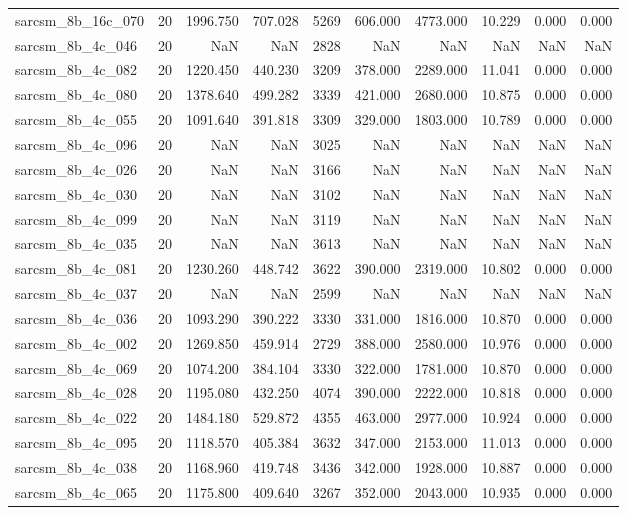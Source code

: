 \begin{tabular}{lrrrrrrrrr}
sarcsm\_8b\_16c\_070 & 20 & 1996.750 & 707.028 & 5269 & 606.000 & 4773.000 & 10.229 & 0.000 & 0.000 \\
sarcsm\_8b\_4c\_046 & 20 & NaN & NaN & 2828 & NaN & NaN & NaN & NaN & NaN \\
sarcsm\_8b\_4c\_082 & 20 & 1220.450 & 440.230 & 3209 & 378.000 & 2289.000 & 11.041 & 0.000 & 0.000 \\
sarcsm\_8b\_4c\_080 & 20 & 1378.640 & 499.282 & 3339 & 421.000 & 2680.000 & 10.875 & 0.000 & 0.000 \\
sarcsm\_8b\_4c\_055 & 20 & 1091.640 & 391.818 & 3309 & 329.000 & 1803.000 & 10.789 & 0.000 & 0.000 \\
sarcsm\_8b\_4c\_096 & 20 & NaN & NaN & 3025 & NaN & NaN & NaN & NaN & NaN \\
sarcsm\_8b\_4c\_026 & 20 & NaN & NaN & 3166 & NaN & NaN & NaN & NaN & NaN \\
sarcsm\_8b\_4c\_030 & 20 & NaN & NaN & 3102 & NaN & NaN & NaN & NaN & NaN \\
sarcsm\_8b\_4c\_099 & 20 & NaN & NaN & 3119 & NaN & NaN & NaN & NaN & NaN \\
sarcsm\_8b\_4c\_035 & 20 & NaN & NaN & 3613 & NaN & NaN & NaN & NaN & NaN \\
sarcsm\_8b\_4c\_081 & 20 & 1230.260 & 448.742 & 3622 & 390.000 & 2319.000 & 10.802 & 0.000 & 0.000 \\
sarcsm\_8b\_4c\_037 & 20 & NaN & NaN & 2599 & NaN & NaN & NaN & NaN & NaN \\
sarcsm\_8b\_4c\_036 & 20 & 1093.290 & 390.222 & 3330 & 331.000 & 1816.000 & 10.870 & 0.000 & 0.000 \\
sarcsm\_8b\_4c\_002 & 20 & 1269.850 & 459.914 & 2729 & 388.000 & 2580.000 & 10.976 & 0.000 & 0.000 \\
sarcsm\_8b\_4c\_069 & 20 & 1074.200 & 384.104 & 3330 & 322.000 & 1781.000 & 10.870 & 0.000 & 0.000 \\
sarcsm\_8b\_4c\_028 & 20 & 1195.080 & 432.250 & 4074 & 390.000 & 2222.000 & 10.818 & 0.000 & 0.000 \\
sarcsm\_8b\_4c\_022 & 20 & 1484.180 & 529.872 & 4355 & 463.000 & 2977.000 & 10.924 & 0.000 & 0.000 \\
sarcsm\_8b\_4c\_095 & 20 & 1118.570 & 405.384 & 3632 & 347.000 & 2153.000 & 11.013 & 0.000 & 0.000 \\
sarcsm\_8b\_4c\_038 & 20 & 1168.960 & 419.748 & 3436 & 342.000 & 1928.000 & 10.887 & 0.000 & 0.000 \\
sarcsm\_8b\_4c\_065 & 20 & 1175.800 & 409.640 & 3267 & 352.000 & 2043.000 & 10.935 & 0.000 & 0.000 \\

\end{tabular}
